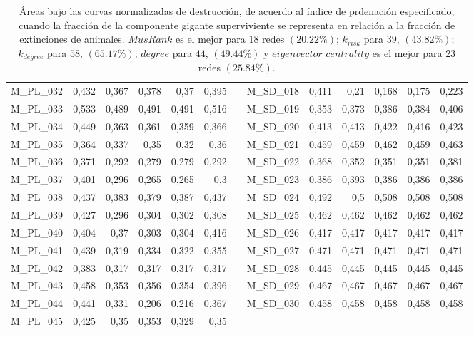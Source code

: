 \begin{table}[htbp]
\begin{adjustbox}{angle=90}
\begin{tabular}{lrrrrrrrrrrrr}
    M\_PL\_032 & 0,432 & 0,367 & 0,378 & 0,37 & 0,395 &      & M\_SD\_018 & 0,411 & 0,21 & 0,168 & 0,175 & 0,223 \\
    M\_PL\_033 & 0,533 & 0,489 & 0,491 & 0,491 & 0,516 &      & M\_SD\_019 & 0,353 & 0,373 & 0,386 & 0,384 & 0,406 \\
    M\_PL\_034 & 0,449 & 0,363 & 0,361 & 0,359 & 0,366 &      & M\_SD\_020 & 0,413 & 0,413 & 0,422 & 0,416 & 0,423 \\
    M\_PL\_035 & 0,364 & 0,337 & 0,35 & 0,32 & 0,36 &      & M\_SD\_021 & 0,459 & 0,459 & 0,462 & 0,459 & 0,463 \\
    M\_PL\_036 & 0,371 & 0,292 & 0,279 & 0,279 & 0,292 &      & M\_SD\_022 & 0,368 & 0,352 & 0,351 & 0,351 & 0,381 \\
    M\_PL\_037 & 0,401 & 0,296 & 0,265 & 0,265 & 0,3  &      & M\_SD\_023 & 0,386 & 0,393 & 0,386 & 0,386 & 0,386 \\
    M\_PL\_038 & 0,437 & 0,383 & 0,379 & 0,387 & 0,437 &      & M\_SD\_024 & 0,492 & 0,5  & 0,508 & 0,508 & 0,508 \\
    M\_PL\_039 & 0,427 & 0,296 & 0,304 & 0,302 & 0,308 &      & M\_SD\_025 & 0,462 & 0,462 & 0,462 & 0,462 & 0,462 \\
    M\_PL\_040 & 0,404 & 0,37 & 0,303 & 0,304 & 0,416 &      & M\_SD\_026 & 0,417 & 0,417 & 0,417 & 0,417 & 0,417 \\
    M\_PL\_041 & 0,439 & 0,319 & 0,334 & 0,322 & 0,355 &      & M\_SD\_027 & 0,471 & 0,471 & 0,471 & 0,471 & 0,471 \\
    M\_PL\_042 & 0,383 & 0,317 & 0,317 & 0,317 & 0,317 &      & M\_SD\_028 & 0,445 & 0,445 & 0,445 & 0,445 & 0,445 \\
    M\_PL\_043 & 0,458 & 0,353 & 0,356 & 0,354 & 0,396 &      & M\_SD\_029 & 0,467 & 0,467 & 0,467 & 0,467 & 0,467 \\
    M\_PL\_044 & 0,441 & 0,331 & 0,206 & 0,216 & 0,367 &      & M\_SD\_030 & 0,458 & 0,458 & 0,458 & 0,458 & 0,458 \\
    M\_PL\_045 & 0,425 & 0,35 & 0,353 & 0,329 & 0,35 &      &      &      &      &      &      &  \\
    \bottomrule
    \end{tabular}%
    \end{adjustbox}
    \caption{\label{table:juanma_destruction} Áreas bajo las curvas normalizadas de destrucción, de acuerdo al índice de prdenación especificado, cuando la fracción de la componente gigante superviviente se representa en relación a la fracción de extinciones de animales. $MusRank$ es el mejor para $18$ redes $(20.22\%)$;
$k_{risk}$ para $39$, $(43.82\%)$; $k_{degree}$ para $58$, $(65.17\%)$; $degree$ para $44$, $(49.44\%)$ y
$eigenvector$ $centrality$ es el mejor para $23$ redes $(25.84\%)$.}
\end{table}%





